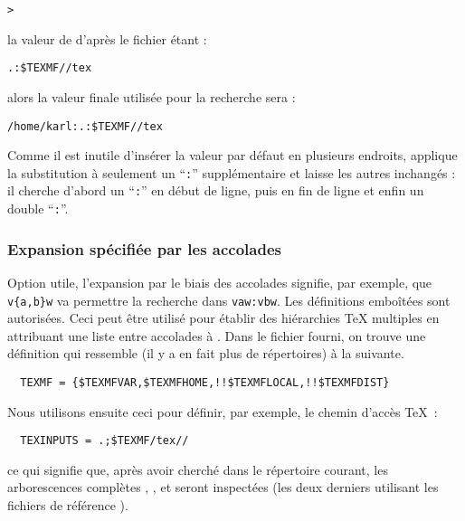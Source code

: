 \documentclass[german, english, french]{article}
\renewcommand{\samp}[1]{\enquote{\texttt{#1}}}
\begin{document}
\begin{alltt}
> 
\end{alltt}
la valeur de  d'après le fichier  étant :

\begin{alltt}
  .:\$TEXMF//tex
\end{alltt}
alors la valeur finale utilisée pour la recherche sera :

\begin{alltt}
  /home/karl:.:\$TEXMF//tex
\end{alltt}

Comme il est inutile d'insérer la valeur par défaut en plusieurs endroits,
\KPS{} applique la substitution à seulement un \samp{:} supplémentaire et laisse
les autres inchangés : il cherche d'abord un \samp{:} en début de ligne, puis en
fin de ligne et enfin un double \samp{:}.

\subsubsection{Expansion spécifiée par les accolades}
\label{sec:brace-expansion}

Option utile, l'expansion par le biais des accolades signifie, par exemple, que
\verb+v{a,b}w+ va permettre la recherche dans \verb+vaw:vbw+. Les définitions
emboîtées sont autorisées. Ceci peut être utilisé pour établir des hiérarchies
\TeX{} multiples en attribuant une liste entre accolades à . Dans
le fichier  fourni, on trouve une définition qui ressemble (il
y a en fait plus de répertoires) à la suivante.
\begin{verbatim}
  TEXMF = {$TEXMFVAR,$TEXMFHOME,!!$TEXMFLOCAL,!!$TEXMFDIST}
\end{verbatim}
Nous utilisons ensuite ceci pour définir, par exemple, le chemin d'accès \TeX\ :
\begin{verbatim}
  TEXINPUTS = .;$TEXMF/tex//
\end{verbatim}
ce qui signifie que, après avoir cherché dans le répertoire courant, les
arborescences complètes , ,
 et  seront inspectées (les deux
derniers utilisant les fichiers de référence ).
\end{document}
